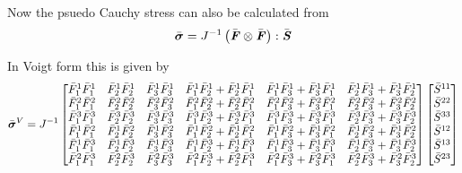 Now the psuedo Cauchy stress can also be calculated from
\begin{equation}
  \bar{\boldsymbol{\mathit{\sigma}}}= {J}^{-1}  \left(  \bar{\boldsymbol{\mathit{F}}} \otimes \bar{\boldsymbol{\mathit{F}}}  \right) : \bar{\boldsymbol{\mathit{S}}} \\
\end{equation}

In Voigt form this is given by
\begin{equation}
  \bar{\boldsymbol{\mathit{\sigma}}}^{V}= {J}^{-1} \begin{bmatrix}
  \bar{F}_{1}^{1}\bar{F}_{1}^{1} & \bar{F}_{2}^{1}\bar{F}_{2}^{1} & \bar{F}_{3}^{1}\bar{F}_{3}^{1} &
  \bar{F}_{1}^{1}\bar{F}_{2}^{1} + \bar{F}_{2}^{1}\bar{F}_{1}^{1} &
  \bar{F}_{1}^{1}\bar{F}_{3}^{1} + \bar{F}_{3}^{1}\bar{F}_{1}^{1} &
  \bar{F}_{2}^{1}\bar{F}_{3}^{1} + \bar{F}_{3}^{1}\bar{F}_{2}^{1} \\
  \bar{F}_{1}^{2}\bar{F}_{1}^{2} & \bar{F}_{2}^{2}\bar{F}_{2}^{2} & \bar{F}_{3}^{2}\bar{F}_{3}^{2} &
  \bar{F}_{1}^{2}\bar{F}_{2}^{2} + \bar{F}_{2}^{2}\bar{F}_{1}^{2} &
  \bar{F}_{1}^{2}\bar{F}_{3}^{2} + \bar{F}_{3}^{2}\bar{F}_{1}^{2} &
  \bar{F}_{2}^{2}\bar{F}_{3}^{2} + \bar{F}_{3}^{2}\bar{F}_{2}^{2} \\
  \bar{F}_{1}^{3}\bar{F}_{1}^{3} & \bar{F}_{2}^{3}\bar{F}_{2}^{3} & \bar{F}_{3}^{3}\bar{F}_{3}^{3} &
  \bar{F}_{1}^{3}\bar{F}_{2}^{3} + \bar{F}_{2}^{3}\bar{F}_{1}^{3} &
  \bar{F}_{1}^{3}\bar{F}_{3}^{3} + \bar{F}_{3}^{3}\bar{F}_{1}^{3} &
  \bar{F}_{2}^{3}\bar{F}_{3}^{3} + \bar{F}_{3}^{3}\bar{F}_{2}^{3} \\
  \bar{F}_{1}^{1}\bar{F}_{1}^{2} & \bar{F}_{2}^{1}\bar{F}_{2}^{2} & \bar{F}_{3}^{1}\bar{F}_{3}^{2} &
  \bar{F}_{1}^{1}\bar{F}_{2}^{2} + \bar{F}_{2}^{1}\bar{F}_{1}^{2} &
  \bar{F}_{1}^{1}\bar{F}_{3}^{2} + \bar{F}_{3}^{1}\bar{F}_{1}^{2} &
  \bar{F}_{2}^{1}\bar{F}_{3}^{2} + \bar{F}_{3}^{1}\bar{F}_{2}^{2} \\
  \bar{F}_{1}^{1}\bar{F}_{1}^{3} & \bar{F}_{2}^{1}\bar{F}_{2}^{3} & \bar{F}_{3}^{1}\bar{F}_{3}^{3} &
  \bar{F}_{1}^{1}\bar{F}_{2}^{3} + \bar{F}_{2}^{1}\bar{F}_{1}^{3} &
  \bar{F}_{1}^{1}\bar{F}_{3}^{3} + \bar{F}_{3}^{1}\bar{F}_{1}^{3} &
  \bar{F}_{2}^{1}\bar{F}_{3}^{3} + \bar{F}_{3}^{1}\bar{F}_{2}^{3} \\
  \bar{F}_{1}^{2}\bar{F}_{1}^{3} & \bar{F}_{2}^{2}\bar{F}_{2}^{3} & \bar{F}_{3}^{2}\bar{F}_{3}^{3} &
  \bar{F}_{1}^{2}\bar{F}_{2}^{3} + \bar{F}_{2}^{2}\bar{F}_{1}^{3} &
  \bar{F}_{1}^{2}\bar{F}_{3}^{3} + \bar{F}_{3}^{2}\bar{F}_{1}^{3} &
  \bar{F}_{2}^{2}\bar{F}_{3}^{3} + \bar{F}_{3}^{2}\bar{F}_{2}^{3} 
  \end{bmatrix}\begin{bmatrix}
    \bar{S}^{11} \\
    \bar{S}^{22} \\
    \bar{S}^{33} \\
    \bar{S}^{12} \\
    \bar{S}^{13} \\
    \bar{S}^{23}
  \end{bmatrix}
\end{equation}

